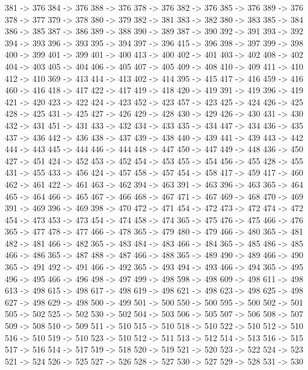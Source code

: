 {	381 -> 376
	384 -> 376
	388 -> 376
	378 -> 376
	382 -> 376
	385 -> 376
	389 -> 376
	378 -> 377
	379 -> 378
	380 -> 379
	382 -> 381
	383 -> 382
	380 -> 383
	385 -> 384
	386 -> 385
	387 -> 386
	389 -> 388
	390 -> 389
	387 -> 390
	392 -> 391
	393 -> 392
	394 -> 393
	396 -> 393
	395 -> 394
	397 -> 396
	415 -> 396
	398 -> 397
	399 -> 398
	400 -> 399
	401 -> 399
	401 -> 400
	413 -> 400
	402 -> 401
	403 -> 402
	408 -> 402
	404 -> 403
	405 -> 404
	406 -> 405
	407 -> 405
	409 -> 408
	410 -> 409
	411 -> 410
	412 -> 410
	369 -> 413
	414 -> 413
	402 -> 414
	395 -> 415
	417 -> 416
	459 -> 416
	460 -> 416
	418 -> 417
	422 -> 417
	419 -> 418
	420 -> 419
	391 -> 419
	396 -> 419
	421 -> 420
	423 -> 422
	424 -> 423
	452 -> 423
	457 -> 423
	425 -> 424
	426 -> 425
	428 -> 425
	431 -> 425
	427 -> 426
	429 -> 428
	430 -> 429
	426 -> 430
	431 -> 430
	432 -> 431
	451 -> 431
	433 -> 432
	434 -> 433
	435 -> 434
	447 -> 434
	436 -> 435
	437 -> 436
	442 -> 436
	438 -> 437
	439 -> 438
	440 -> 439
	441 -> 439
	443 -> 442
	444 -> 443
	445 -> 444
	446 -> 444
	448 -> 447
	450 -> 447
	449 -> 448
	436 -> 450
	427 -> 451
	424 -> 452
	453 -> 452
	454 -> 453
	455 -> 454
	456 -> 455
	428 -> 455
	431 -> 455
	433 -> 456
	424 -> 457
	458 -> 457
	454 -> 458
	417 -> 459
	417 -> 460
	462 -> 461
	422 -> 461
	463 -> 462
	394 -> 463
	391 -> 463
	396 -> 463
	365 -> 464
	465 -> 464
	466 -> 465
	467 -> 466
	468 -> 467
	471 -> 467
	469 -> 468
	470 -> 469
	391 -> 469
	396 -> 469
	398 -> 470
	472 -> 471
	454 -> 472
	473 -> 472
	474 -> 472
	454 -> 473
	453 -> 473
	454 -> 474
	458 -> 474
	365 -> 475
	476 -> 475
	466 -> 476
	365 -> 477
	478 -> 477
	466 -> 478
	365 -> 479
	480 -> 479
	466 -> 480
	365 -> 481
	482 -> 481
	466 -> 482
	365 -> 483
	484 -> 483
	466 -> 484
	365 -> 485
	486 -> 485
	466 -> 486
	365 -> 487
	488 -> 487
	466 -> 488
	365 -> 489
	490 -> 489
	466 -> 490
	365 -> 491
	492 -> 491
	466 -> 492
	365 -> 493
	494 -> 493
	466 -> 494
	365 -> 495
	496 -> 495
	466 -> 496
	498 -> 497
	499 -> 498
	598 -> 498
	609 -> 498
	611 -> 498
	613 -> 498
	615 -> 498
	617 -> 498
	619 -> 498
	621 -> 498
	623 -> 498
	625 -> 498
	627 -> 498
	629 -> 498
	500 -> 499
	501 -> 500
	550 -> 500
	595 -> 500
	502 -> 501
	505 -> 502
	525 -> 502
	530 -> 502
	504 -> 503
	506 -> 505
	507 -> 506
	508 -> 507
	509 -> 508
	510 -> 509
	511 -> 510
	515 -> 510
	518 -> 510
	522 -> 510
	512 -> 510
	516 -> 510
	519 -> 510
	523 -> 510
	512 -> 511
	513 -> 512
	514 -> 513
	516 -> 515
	517 -> 516
	514 -> 517
	519 -> 518
	520 -> 519
	521 -> 520
	523 -> 522
	524 -> 523
	521 -> 524
	526 -> 525
	527 -> 526
	528 -> 527
	530 -> 527
	529 -> 528
	531 -> 530
}
